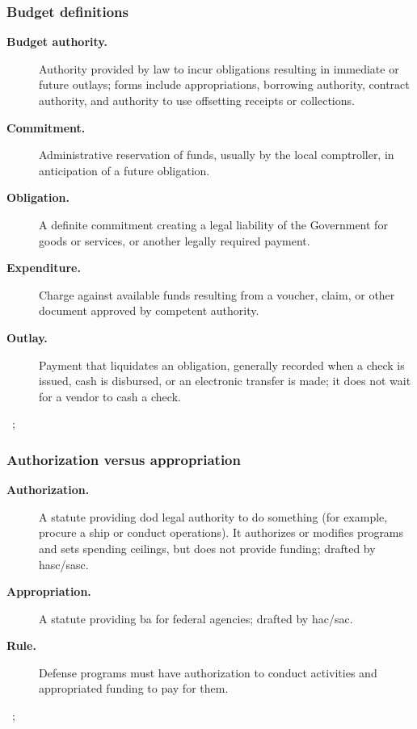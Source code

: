 \documentclass[../main.tex]{subfiles}
\begin{document}
\subsubsection{Budget definitions}
\begin{description}
  \item[\textbf{Budget authority.}] Authority provided by law to incur obligations resulting in immediate or future outlays; forms include appropriations, borrowing authority, contract authority, and authority to use offsetting receipts or collections.
  \item[\textbf{Commitment.}] Administrative reservation of funds, usually by the local comptroller, in anticipation of a future obligation.
  \item[\textbf{Obligation.}] A definite commitment creating a legal liability of the Government for goods or services, or another legally required payment.
  \item[\textbf{Expenditure.}] Charge against available funds resulting from a voucher, claim, or other document approved by competent authority.
  \item[\textbf{Outlay.}] Payment that liquidates an obligation, generally recorded when a check is issued, cash is disbursed, or an electronic transfer is made; it does not wait for a vendor to cash a check.
\end{description}
~\autocite{GAO-Budget-Glossary-2005,OMB-A11,DoDFMR-Vol3}; 

\subsubsection{Authorization versus appropriation}
\begin{description}
  \item[\textbf{Authorization.}] A statute providing \ac{dod} legal authority to do something (for example, procure a ship or conduct operations). It authorizes or modifies programs and sets spending ceilings, but does not provide funding; drafted by \ac{hasc}/\ac{sasc}.
  \item[\textbf{Appropriation.}] A statute providing \ac{ba} for federal agencies; drafted by \ac{hac}/\ac{sac}.
  \item[\textbf{Rule.}] Defense programs must have authorization to conduct activities and appropriated funding to pay for them.
\end{description}
~\autocite{CRS-R46497-Authorizations-Appropriations,HASC-Subcommittees-2026,SASC-Subcommittee-Leadership-119-2025,HAC-Subcommittees-2026,SAC-Subcommittees-2026}; 
\end{document}
